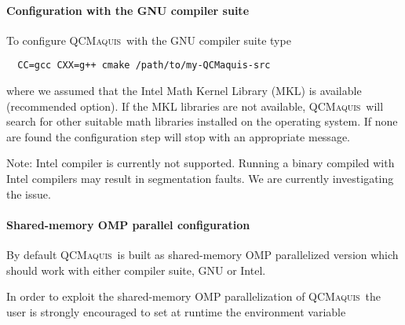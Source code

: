 \documentclass[bibliography=totoc,12pt,a4paper]{scrartcl}
\newcommand{\qcm}{\textsc{QCMaquis}}
\begin{document}
\paragraph{Configuration with the GNU compiler suite}
\label{sec:gnu-conf-stand}$\;$\\

\noindent To configure \qcm\ with the GNU compiler suite type

\begin{verbatim}
  CC=gcc CXX=g++ cmake /path/to/my-QCMaquis-src
\end{verbatim}
%
where we assumed that the Intel Math Kernel Library (MKL) is available (recommended option).
If the MKL libraries are not available, \qcm\ will search for other suitable math libraries installed on the operating system. If none are found the configuration step will stop with an appropriate message.

%

\begin{framed}
 \noindent Note: Intel compiler is currently not supported. Running a binary compiled with Intel compilers may result in segmentation faults. We are currently investigating the issue.
\end{framed}

\paragraph{Shared-memory OMP parallel configuration}
\label{sec:parallel-stand}$\;$\\

By default \qcm\ is built as shared-memory OMP parallelized version which should work with either compiler suite, GNU or Intel.

\vspace{2ex}

In order to exploit the shared-memory OMP parallelization of \qcm\ the user is strongly encouraged to set at runtime the environment variable
\end{document}
